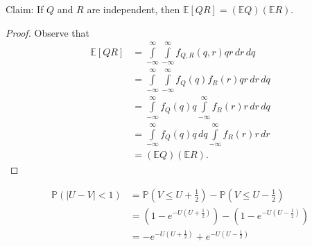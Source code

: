 \documentclass[12pt]{article}
\begin{document}
\medskip
{} Claim: If $Q$ and $R$ are independent, then $\mathbb E[QR] = (\mathbb EQ)(\mathbb ER)$.
\begin{proof}
    Observe that
    \begin{align*}
        \mathbb E[QR] &= \int\limits_{-\infty}^\infty \int\limits_{-\infty}^\infty f_{Q,R}(q,r) qr\,dr\,dq \\
                      &= \int\limits_{-\infty}^\infty \int\limits_{-\infty}^\infty f_Q(q)f_R(r) qr\,dr\,dq \\
                      &= \int\limits_{-\infty}^\infty f_Q(q)q \int\limits_{-\infty}^\infty f_R(r) r\,dr\,dq \\
                      &= \int\limits_{-\infty}^\infty f_Q(q)q \,dq\int\limits_{-\infty}^\infty f_R(r) r\,dr \\
                      &= (\mathbb EQ)(\mathbb ER).
    \end{align*}
\end{proof}

\newpage
{}

\medskip
{}

\medskip
{}
\begin{align*}
    \mathbb P(|U-V|<1) &= \mathbb P(V \leq U + \frac12) - \mathbb P(V \leq U - \frac12) \\
                       &= (1 - e^{-U(U+\frac12)}) - (1 - e^{-U(U-\frac12)}) \\
                       &= -e^{-U(U+\frac12)} + e^{-U(U-\frac12)}
\end{align*}
\end{document}
